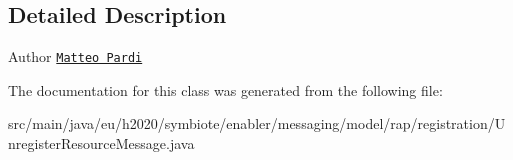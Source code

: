 \subsection{Detailed Description}
\begin{DoxyAuthor}{Author}
\href{mailto:m.pardi@nextworks.it}{\tt Matteo Pardi} 
\end{DoxyAuthor}


The documentation for this class was generated from the following file\+:\begin{DoxyCompactItemize}
\item 
src/main/java/eu/h2020/symbiote/enabler/messaging/model/rap/registration/Unregister\+Resource\+Message.\+java\end{DoxyCompactItemize}
